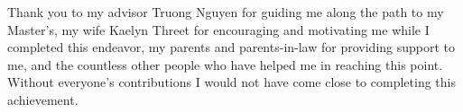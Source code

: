 \begin{frontmatter}
%
\tableofcontents
\listoffigures  %
\listoftables   %



%
%
\begin{acknowledgements}
Thank you to my advisor Truong Nguyen for guiding me along the path to my Master's, my wife Kaelyn Threet for encouraging and motivating me while I completed this endeavor, my parents and parents-in-law for providing support to me, and the countless other people who have helped me in reaching this point. Without everyone's contributions I would not have come close to completing this achievement.
\end{acknowledgements}


%
%



\end{frontmatter}
